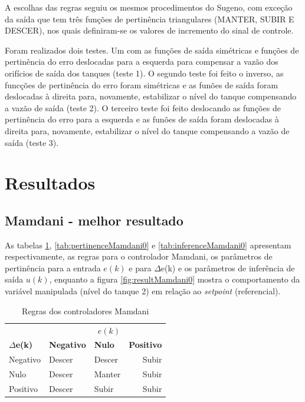 \documentclass[
	twoside,				%
	twocolumn,				%
	english,				%
	brazil,					%
]{article}
\begin{document}
A escolhas das regras seguiu os mesmos procedimentos do Sugeno, com exceção da saída que tem três funções de pertinência triangulares (MANTER, SUBIR E DESCER), nos quais definiram-se os valores de incremento do sinal de controle.

Foram realizados dois testes. Um com as funções de saída simétricas e funções de pertinência do erro deslocadas para a esquerda para compensar a vazão dos orifícios de saída dos tanques (teste 1). O segundo teste foi feito o inverso, as funcções de pertinência do erro foram simétricas e as funões de saída foram deslocadas à direita para, novamente, estabilizar o nível do tanque compensando a vazão de saída (teste 2). O terceiro teste foi feito deslocando as funções de pertinência do erro para a esquerda e as funões de saída foram deslocadas à direita para, novamente, estabilizar o nível do tanque compensando a vazão de saída (teste 3).

\section{Resultados}\label{resultados}

\subsection{Mamdani - melhor resultado}

As tabelas \ref{tab:rulesMamdani0}, \ref{tab:pertinenceMamdani0} e \ref{tab:inferenceMamdani0} apresentam respectivamente, as regras para o controlador Mamdani, os parâmetros de pertinência para a entrada $e(k)$ e para $\Delta$e(k) e os parâmetros de inferência de saída $u(k)$, enquanto a figura \ref{fig:resultMamdani0} mostra o comportamento da variável manipulada (nível do tanque 2) em relação ao \textit{setpoint} (referencial).

\begin{table}[!ht]
\caption{Regras dos controladores Mamdani}
\label{tab:rulesMamdani0}
\centering
\begin{tabular}{lllr}
\toprule
\multicolumn{3}{r}{\textbf{$e(k)$}} \\
\cmidrule(r){2-4}
\textbf{$\Delta$e(k)} & \textbf{Negativo} & \textbf{Nulo} & \textbf{Positivo} \\
Negativo & Descer & Descer & Subir \\
Nulo & Descer & Manter & Subir \\
Positivo & Descer & Subir & Subir \\
\bottomrule
\end{tabular}
\end{table}
\end{document}
